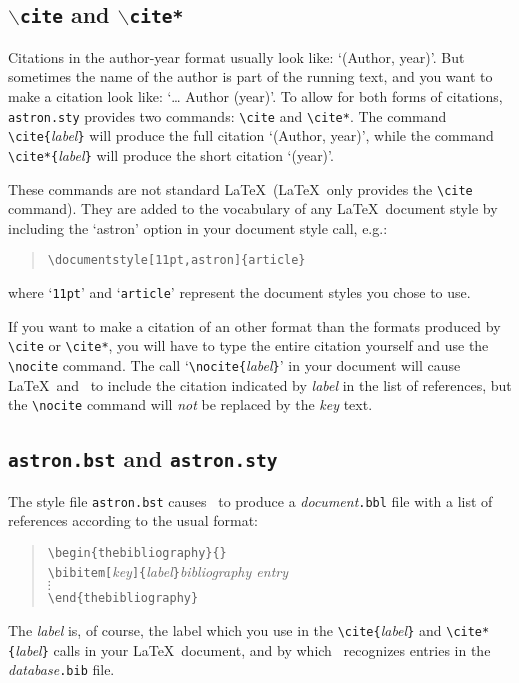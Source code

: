 \subsection{$\backslash${\tt cite} and $\backslash${\tt cite*}}

Citations in the author-year format usually look like: `(Author, year)'.
But sometimes the name of the author is part of the running text,
and you want to make a citation look like: `\ldots{} Author (year)'.
To allow for both forms of citations, {\tt astron.sty} provides two
commands: \verb|\cite| and \verb|\cite*|.
The command \verb|\cite{|{\it label\/}\verb|}| will produce the full
citation `(Author, year)', while the command
\verb|\cite*{|{\it label\/}\verb|}| will produce the short citation `(year)'.

These commands are not standard \LaTeX\ (\LaTeX\ only provides the \verb|\cite|
command).
They are added to the vocabulary of any \LaTeX\ document style by including
the `astron' option in your document style call, e.g.:
\begin{quotation}
 \noindent\verb|\documentstyle[11pt,astron]{article}|
\end{quotation}
where `{\tt 11pt}' and `{\tt article}' represent the document styles you
chose to use.

If you want to make a citation of an other format than the formats produced
by \verb|\cite| or \verb|\cite*|, you will have to type the entire citation
yourself and use the \verb|\nocite| command.
The call `\verb|\nocite{|{\it label\/}\verb|}|' in your document will cause
\LaTeX\ and \BibTeX\ to include the citation indicated by {\it label\/} in
the list of references, but the \verb|\nocite| command will {\sl not\/}
be replaced by the {\it key\/} text.

\subsection{{\tt astron.bst} and {\tt astron.sty}}

The style file {\tt astron.bst} causes \BibTeX\ to produce a
{\it document\/}{\tt .bbl} file with a list of references according
to the usual format:
%
\begin{quotation}
\noindent \verb|\begin{thebibliography}{}| \\
\verb|\bibitem[|{\it key}\verb|]{|{\it label}\verb|}|{\it bibliography entry} \\
\indent $\vdots$ \\
\verb|\end{thebibliography}|
\end{quotation}
%
The {\it label\/} is, of course, the label which you use in the
\verb|\cite{|{\it label\/}\verb|}| and \verb|\cite*{|{\it label\/}\verb|}|
calls in your \LaTeX\ document, and by which \BibTeX\ recognizes entries
in the {\it database\/}{\tt.bib} file.

